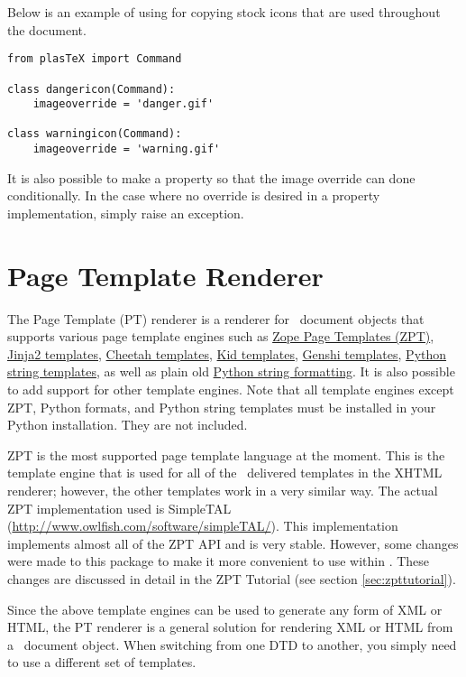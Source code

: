 Below is an example of using  for copying 
stock icons that are used throughout the document.
\begin{verbatim}
from plasTeX import Command

class dangericon(Command):
    imageoverride = 'danger.gif'

class warningicon(Command):
    imageoverride = 'warning.gif'
\end{verbatim}

It is also possible to make  a property
so that the image override can done conditionally.  In the case
where no override is desired in a property implementation, simply
raise an  exception.

\section{Page Template Renderer\label{sec:zpt}}

The Page Template (PT) renderer is a renderer for \plasTeX\ document
objects that supports various page template engines such as 
\href{http://www.zope.org/Documentation/Books/ZopeBook/2_6Edition/ZPT.stx}{Zope
Page Templates (ZPT)}, \href{http://jinja.pocoo.org/}{Jinja2 templates},
\href{http://www.cheetahtemplate.org/}{Cheetah templates}, 
\href{http://kid-templating.org/}{Kid templates}, 
\href{http://genshi.edgewall.org/}{Genshi templates}, 
\href{http://docs.python.org/lib/node40.html}{Python string templates}, 
as well as plain old \href{http://docs.python.org/lib/typesseq-strings.html}{Python string formatting}.  It is also possible to add support for other 
template engines.  Note that all template engines except ZPT, Python formats, 
and Python string templates must be installed in your Python installation. 
They are not included.

ZPT is the most supported page template language at the moment.  This is the
template engine that is used for all of the \plasTeX\ delivered templates
in the XHTML renderer; however, the other templates work in a very similar way.
The actual ZPT implementation used is SimpleTAL 
(\url{http://www.owlfish.com/software/simpleTAL/}).  This implementation
implements almost all of the ZPT API and is very stable.  However, some
changes were made to this package to make it more convenient to use
within \plasTeX.  These changes are discussed in detail in the 
ZPT Tutorial (see section \ref{sec:zpttutorial}).

Since the above template engines can be used to generate any form of 
XML or HTML, the PT
renderer is a general solution for rendering XML or HTML from a 
\plasTeX\ document object.  When switching from one DTD to another, 
you simply need to use a different set of templates.

